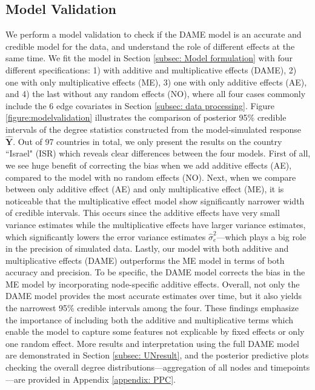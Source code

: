 \documentclass[a4paper]{article}
\begin{document}
\subsection{Model Validation}\label{subsec: Model Validation}
We perform a model validation to check if the DAME model is an accurate and credible model for the data, and understand the role of different effects at the same time. We fit the model in Section \ref{subsec: Model formulation} with four different specifications: 1) with additive and multiplicative effects (DAME), 2) one with only multiplicative effects (ME), 3) one with only additive effects (AE), and 4) the last without any random effects (NO), where all four cases commonly include the 6 edge covariates in Section \ref{subsec: data processing}. Figure \ref{figure:modelvalidation} illustrates the comparison of posterior 95\% credible intervals of the degree statistics constructed from the model-simulated response $\hat{\mathbf{Y}}$. Out of 97 countries in total, we only present the results on the country ``Israel" (ISR) which reveals clear differences between the four models. First of all, we see huge benefit of correcting the bias when we add additive effects (AE), compared to the model with no random effects (NO). Next, when we compare between only additive effect (AE) and only multiplicative effect (ME), it is noticeable that the multiplicative effect model show significantly narrower width of credible intervals. This occurs since the additive effects have very small variance estimates while the multiplicative effects have larger variance estimates, which significantly lowers the error variance estimates $\hat\sigma_e^2$---which plays a big role in the precision of simulated data. Lastly, our model with both additive and multiplicative effects (DAME) outperforms the ME model in terms of both accuracy and precision. To be specific, the DAME model corrects the bias in the ME model by incorporating node-specific additive effects. Overall, not only the DAME model provides the most accurate estimates over time, but it also yields the narrowest 95\% credible intervals among the four. These findings emphasize the importance of including both the additive and multiplicative terms which enable the model to capture some features not explicable by fixed effects or only one random effect. More results and interpretation using the full DAME model are demonstrated in Section \ref{subsec: UNresult}, and the posterior predictive plots checking the overall degree distributions---aggregation of all nodes and timepoints---are provided in Appendix \ref{appendix: PPC}.
\end{document}
